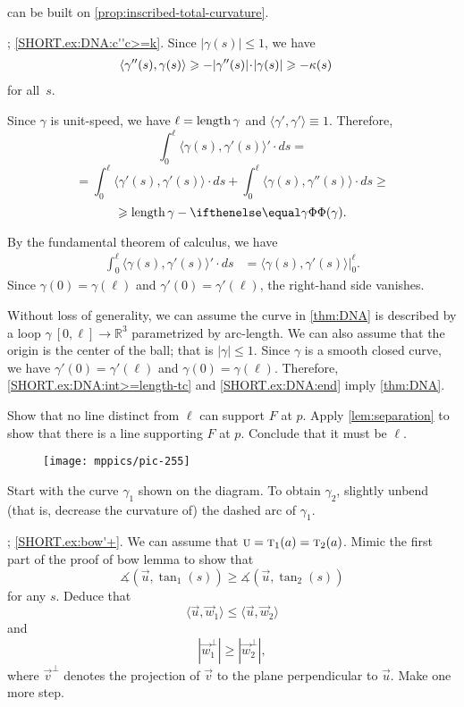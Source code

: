 \begin{multicols}{2}
 can be built on \ref{prop:inscribed-total-curvature}.

\parbf{\ref{ex:DNA}}; \ref{SHORT.ex:DNA:c''c>=k}.
Since $|\gamma(s)|\le 1$, we have
\begin{align*}
\langle\gamma''(s),\gamma(s)\rangle&\ge -|\gamma''(s)|\cdot|\gamma(s)|\ge-\kur(s)
\end{align*}
for all~$s$.

Since $\gamma$ is unit-speed, we have $\ell=\mathop{\rm length}\nolimits\gamma$ and $\langle\gamma',\gamma'\rangle\equiv1$.
Therefore,
\[\int_0^\ell\langle\gamma(s),\gamma'(s)\rangle'\cdot ds
=\]
\[=\int_0^\ell\langle\gamma'(s),\gamma'(s)\rangle\cdot ds+\int_0^\ell\langle\gamma(s),\gamma''(s)\rangle\cdot ds\ge\]
\[\ge \length\gamma-\tc\gamma.\]


By the fundamental theorem of calculus, we have
\begin{align*}
\int_0^\ell\langle\gamma(s),\gamma'(s)\rangle'\cdot ds
&=\langle\gamma(s),\gamma'(s)\rangle\bigg|_0^\ell.
\end{align*}
Since $\gamma(0)=\gamma(\ell)$ and $\gamma'(0)=\gamma'(\ell)$, the right-hand side vanishes.

Without loss of generality, we can assume the curve in \ref{thm:DNA} is described by a loop $\gamma\:[0,\ell]\to\mathbb{R}^3$ parametrized by arc-length.
We can also assume that the origin is the center of the ball; that is $|\gamma|\le 1$.
Since $\gamma$ is a smooth closed curve, we have 
$\gamma'(0)=\gamma'(\ell)$ and $\gamma(0)=\gamma(\ell)$.
Therefore, \ref{SHORT.ex:DNA:int>=length-tc} and \ref{SHORT.ex:DNA:end} imply \ref{thm:DNA}.

Show that no line distinct from $\ell$ can support $F$ at $p$. 
Apply \ref{lem:separation} to show that there is a line supporting $F$ at $p$.
Conclude that it must be $\ell$.

{

\begin{wrapfigure}{r}{22 mm}
\vskip-6mm
\centering
\texttt{[image: mppics/pic-255]}
\vskip0mm
\end{wrapfigure}

Start with the curve $\gamma_1$ shown on the diagram.
To obtain $\gamma_2$, slightly unbend (that is, decrease the curvature of) the dashed arc of $\gamma_1$.

}

\parbf{\ref{ex:bow'}}; \ref{SHORT.ex:bow'+}.
We can assume that $\vec u=\tan_1(a)\z=\tan_2(a)$.
Mimic the first part of the proof of bow lemma to show that 
\[\measuredangle(\vec u,\tan_1(s))\ge \measuredangle(\vec u,\tan_2(s))\]
for any $s$.
Deduce that
\[\langle \vec u,\vec w_1\rangle \le \langle \vec u,\vec w_2\rangle\]
and 
\[|\vec w_1^\perp| \ge |\vec w_2^\perp|,\]
where $\vec v^\perp$ denotes the projection of $\vec v$ to the plane perpendicular to $\vec u$.
Make one more step.


\end{multicols}
